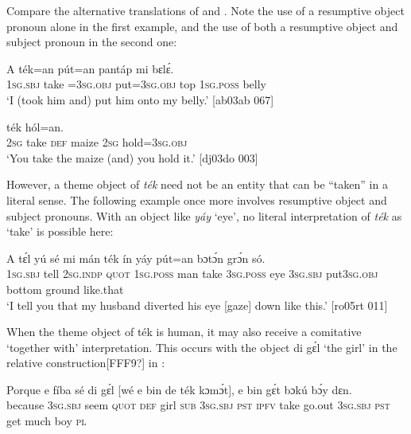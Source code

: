 Compare the alternative translations of  and . Note the use of a resumptive object pronoun alone in the first example, and the use of both a resumptive object and subject pronoun in the second one:



\ea%
    \label{ex:key:1564}
    \gll A    ték=an    pút=an    pantáp  mi    bɛlɛ́.\\
\textsc{1sg.sbj}  take  =\textsc{3sg.obj}  put=\textsc{3sg.obj}  top    \textsc{1sg.poss}  belly\\

\glt ‘I (took him and) put him onto my belly.’ [ab03ab 067]
\z


\ea%
    \label{ex:key:1565}
    \gll {}  ték\textstylePichiexamplebold{}         hól=an.\\
\textsc{2sg}  take    \textsc{def}  maize  \textsc{2sg}  hold=\textsc{3sg.obj}\\

\glt ‘You take the maize (and) you hold it.’ [dj03do 003]
\z

However, a theme object of \textit{ték} need not be an entity that can be “taken” in a literal sense. The following example once more involves resumptive object and subject pronouns. With an object like \textit{yáy} ‘eye’, no literal interpretation of \textit{ték} as ‘take’ is possible here: 


\ea%
    \label{ex:key:1566}
    \gll A    tɛ́l  yú    sé    mi    mán  ték    ín    yáy  
    pút=an    bɔtɔ́n  grɔ́n    só.\\
\textsc{1sg.sbj}  tell  \textsc{2sg.indp}  \textsc{quot}    \textsc{1sg.poss}  man    take    \textsc{3sg.poss}  eye  
\textsc{3sg.sbj}  put\textsc{3sg.obj}  bottom  ground  like.that\\

\glt ‘I tell you that my husband diverted his eye [gaze] down like this.’ [ro05rt 011]
\z

When the theme object of ték is human, it may also receive a comitative ‘together with’ interpretation. This occurs with the object di gɛ́l ‘the girl’ in the relative construction[FFF9?] in : 


\ea%
    \label{ex:key:1567}
    \gll Porque  e    fíba    sé    di  gɛ́l  [wé  e    bin  de  ték    kɔmɔ́t],
e    bin  gɛ́t  bɔkú  bɔ́y  dɛn.\\
because  \textsc{3sg.sbj}  seem  \textsc{quot}    \textsc{def}  girl   \textsc{sub}  \textsc{3sg.sbj}  \textsc{pst}  \textsc{ipfv}  take    go.out
\textsc{3sg.sbj}  \textsc{pst}  get  much  boy  \textsc{pl}\\

